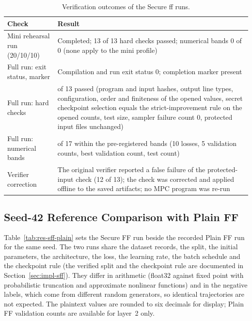 \begin{table}[htbp]
\centering
\small
\begin{tabular}{@{}>{\raggedright\arraybackslash}p{4.6cm}>{\raggedright\arraybackslash}p{9.2cm}@{}}
\toprule
Check & Result \\
\midrule
Mini rehearsal run (20/10/10) & Completed; 13 of 13 hard checks passed; numerical bands 0 of 0 (none apply to the mini profile) \\
Full run: exit status, marker & Compilation and run exit status 0; completion marker present \\
Full run: hard checks & 13 of 13 passed (program and input hashes, output line types, configuration, order and finiteness of the opened values, secret checkpoint selection equals the strict-improvement rule on the opened counts, test size, sampler failure count 0, protected input files unchanged) \\
Full run: numerical bands & 17 of 17 within the pre-registered bands (10 losses, 5 validation counts, best validation count, test count) \\
Verifier correction & The original verifier reported a false failure of the protected-input check (12 of 13); the check was corrected and applied offline to the saved artifacts; no MPC program was re-run \\
\bottomrule
\end{tabular}
\caption{Verification outcomes of the Secure \ac{ff} runs.}
\label{tab:res-sff-verify}
\end{table}

\FloatBarrier
\subsection{Seed-42 Reference Comparison with Plain FF}\label{sec:res-sff-plain}
Table~\ref{tab:res-sff-plain} sets the Secure FF run beside the recorded Plain FF run for the same seed. The two runs share the dataset records, the split, the initial parameters, the architecture, the loss, the learning rate, the batch schedule and the checkpoint rule (the verified split and the checkpoint rule are documented in Section~\ref{sec:impl-sff}). They differ in arithmetic (float32 against fixed point with probabilistic truncation and approximate nonlinear functions) and in the negative labels, which come from different random generators, so identical trajectories are not expected. The plaintext values are rounded to six decimals for display; Plain FF validation counts are available for layer~2 only.

